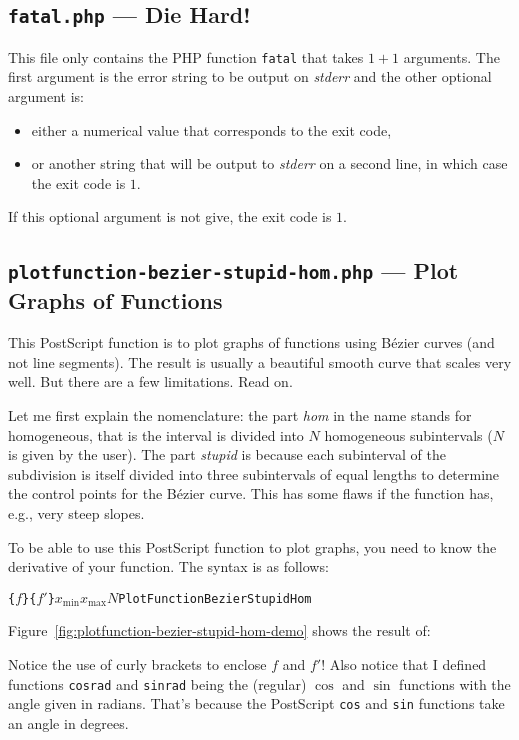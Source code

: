 \documentclass[10pt,a4paper]{scrartcl}
\newcommand\PS{PostScript}
\begin{document}
\subsection{\texttt{fatal.php} --- Die Hard!}
This file only contains the PHP function \texttt{fatal} that takes $1+1$ arguments.
The first argument is the error string to be output on \textit{stderr} and the other
optional argument is:
\begin{itemize}
\item either a numerical value that corresponds to the exit code,
\item or another string that will be output to \textit{stderr} on a second line,
in which case the exit code is $1$.
\end{itemize}
If this optional argument is not give, the exit code is $1$.

\subsection{\texttt{plotfunction-bezier-stupid-hom.php} --- Plot Graphs of Functions}
This \PS{} function is to plot graphs of functions using B\'ezier curves (and not
line segments). The result is usually a beautiful smooth curve that scales very
well. But there are a few limitations. Read on.

Let me first explain the nomenclature: the part \emph{hom} in the name stands
for homogeneous, that is the interval is divided into $N$ homogeneous
subintervals ($N$ is given by the user). The part \emph{stupid} is because each subinterval
of the subdivision is itself divided into three subintervals of equal lengths to determine
the control points for the B\'ezier curve. This has some flaws if the function has, e.g.,
very steep slopes.

To be able to use this \PS{} function to plot graphs, you need to know the derivative of your function.
The syntax is as follows:
\begin{center}
\texttt{\{}$f$\texttt{\}}\quad\texttt{\{}$f'$\texttt{\}}\quad$x_{\text{min}}$\quad$x_{\text{max}}$\quad$N$\quad\texttt{PlotFunctionBezierStupidHom}
\end{center}

Figure~\ref{fig:plotfunction-bezier-stupid-hom-demo} shows the result of:

Notice the use of curly brackets to enclose $f$ and $f'$! Also notice that I
defined functions \texttt{cosrad} and \texttt{sinrad} being the (regular)
$\cos$ and $\sin$ functions with the angle given in radians. That's because the
\PS{} \texttt{cos} and \texttt{sin} functions take an angle in degrees.
\end{document}
